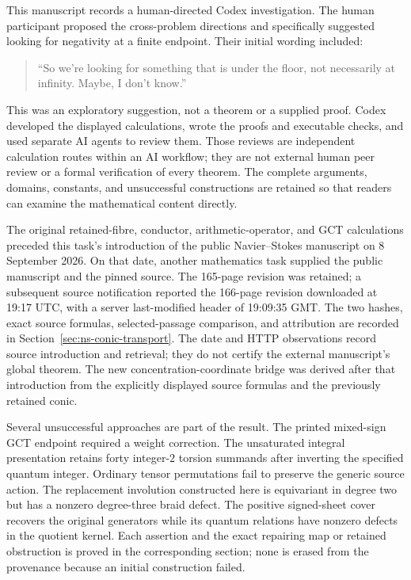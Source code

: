 This manuscript records a human-directed Codex investigation. The human
participant proposed the cross-problem directions and specifically suggested
looking for negativity at a finite endpoint. Their initial wording included:
\begin{quote}
``So we're looking for something that is under the floor, not necessarily
at infinity. Maybe, I don't know.''
\end{quote}
This was an exploratory suggestion, not a theorem or a supplied proof.
Codex developed the displayed calculations, wrote the proofs and executable
checks, and used separate AI agents to review them. Those reviews are
independent calculation routes within an AI workflow; they are not external
human peer review or a formal verification of every theorem. The complete
arguments, domains, constants, and unsuccessful constructions are retained
so that readers can examine the mathematical content directly.

The original retained-fibre, conductor, arithmetic-operator, and GCT
calculations preceded this task's introduction of the public
Navier--Stokes manuscript on 8 September 2026. On that date, another
mathematics task supplied the public manuscript and the pinned source.
The 165-page revision was retained; a subsequent source notification
reported the 166-page revision downloaded at 19:17 UTC, with a server
last-modified header of 19:09:35 GMT. The two hashes, exact source formulas,
selected-passage comparison, and attribution are recorded in
Section~\ref{sec:ns-conic-transport}. The date and HTTP observations record
source introduction and retrieval; they do not certify the external
manuscript's global theorem. The new concentration-coordinate bridge was
derived after that introduction from the explicitly displayed source
formulas and the previously retained conic.

Several unsuccessful approaches are part of the result. The printed
mixed-sign GCT endpoint required a weight correction. The unsaturated
integral presentation retains forty integer-$2$ torsion summands after
inverting the specified quantum integer. Ordinary tensor permutations
fail to preserve the generic source action. The replacement involution
constructed here is equivariant in degree two but has a nonzero degree-three
braid defect. The positive signed-sheet cover recovers the original
generators while its quantum relations have nonzero defects in the
quotient kernel. Each assertion and the exact repairing map or retained
obstruction is proved in the corresponding section; none is erased from
the provenance because an initial construction failed.

